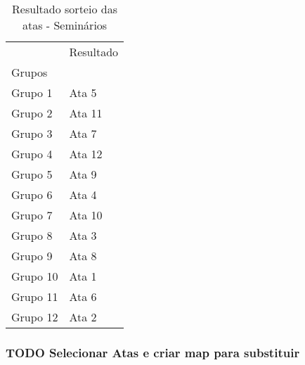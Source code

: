 \documentclass[11pt]{article}
\begin{document}
\begin{table}
\centering
\caption{Resultado sorteio das atas - Seminários}
\begin{tabular}{ll}
\toprule
{} & Resultado \\
Grupos   &           \\
\midrule
Grupo 1  &     Ata 5 \\
Grupo 2  &    Ata 11 \\
Grupo 3  &     Ata 7 \\
Grupo 4  &    Ata 12 \\
Grupo 5  &     Ata 9 \\
Grupo 6  &     Ata 4 \\
Grupo 7  &    Ata 10 \\
Grupo 8  &     Ata 3 \\
Grupo 9  &     Ata 8 \\
Grupo 10 &     Ata 1 \\
Grupo 11 &     Ata 6 \\
Grupo 12 &     Ata 2 \\
\bottomrule
\end{tabular}
\end{table}



\subsubsection{{\bfseries\sffamily TODO} Selecionar Atas e criar map para substituir}
\label{sec:orga650919}
\end{document}
